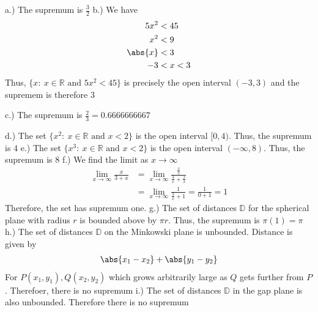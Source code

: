 \documentclass{report}
\begin{document}
    \bigbreak \noindent 
    a.) The supremum is $\frac{3}{2}$
    \bigbreak \noindent 
    b.) We have
    \begin{align*}
        5x^{2} &< 45 \\
        x^{2} &< 9 \\
        \abs{x} &< 3 \\
        -3 &< x < 3
    \end{align*}
    Thus, $ \{x:\ x\in \mathbb{R} \text{ and } 5x^{2} < 45\} $ is precisely the open interval $(-3,3)$ and the supremem is therefore $3$

    \bigbreak \noindent 
    c.) The supremum is $\frac{2}{3} = 0.6666666667$

    \bigbreak \noindent 
    d.) The set $\{x^{2}:\ x\in \mathbb{R} \text{ and } x<2\} $ is the open interval $[0,4)$. Thus, the supremum is 4
    \bigbreak \noindent 
    e.) The set $\{x^{3}:\ x\in \mathbb{R} \text{ and } x<2\} $ is the open interval $(-\infty,8) $. Thus, the supremum is 8
    \bigbreak \noindent 
    f.) We find the limit as $x\to \infty $
    \begin{align*}
        \lim\limits_{x \to \infty}{\frac{x}{3+x}} &= \lim\limits_{x \to \infty}{\frac{\frac{x}{x}}{\frac{3}{x} + \frac{x}{x}}} \\
        &=\lim\limits_{x \to \infty}{\frac{1}{\frac{3}{x} + 1}} = \frac{1}{0+1} = 1
    \end{align*}
    Therefore, the set has supremum one.
    \bigbreak \noindent 
    g.) The set of distances $\mathbb{D}$ for the spherical plane with radius $r$ is bounded above by $\pi r $. Thus, the supremum is $\pi(1)=  \pi $
    \bigbreak \noindent 
    h.) The set of distances $\mathbb{D}$ on the Minkowski plane is unbounded. Distance is given by
    \begin{align*}
        \abs{x_{1} - x_{2}} + \abs{y_{1} -y_{2}}
    \end{align*}
    For $P(x_{1}, y_{1}), Q(x_{2}, y_{2})$ which grows arbitrarily large as $Q$ gets further from $P$. Therefoer, there is no supremum
    \bigbreak \noindent 
    i.) The set of distances $\mathbb{D}$ in the gap plane is also unbounded. Therefore there is no supremum 
\end{document}
